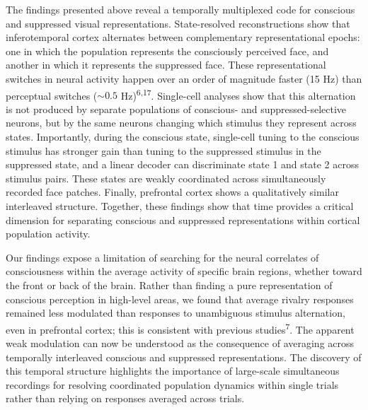 \documentclass{article}
\begin{document}
The findings presented above reveal a temporally multiplexed code for conscious and suppressed visual representations. State-resolved reconstructions show that inferotemporal cortex alternates between complementary representational epochs: one in which the population represents the consciously perceived face, and another in which it represents the suppressed face. These representational switches in neural activity happen over an order of magnitude faster (15 Hz) than perceptual switches (${\sim}0.5$ Hz)\textsuperscript{6,17}. Single-cell analyses show that this alternation is not produced by separate populations of conscious- and suppressed-selective neurons, but by the same neurons changing which stimulus they represent across states. Importantly, during the conscious state, single-cell tuning to the conscious stimulus has stronger gain than tuning to the suppressed stimulus in the suppressed state, and a linear decoder can discriminate state 1 and state 2 across stimulus pairs. These states are weakly coordinated across simultaneously recorded face patches. Finally, prefrontal cortex shows a qualitatively similar interleaved structure. Together, these findings show that time provides a critical dimension for separating conscious and suppressed representations within cortical population activity.

Our findings expose a limitation of searching for the neural correlates of consciousness within the average activity of specific brain regions, whether toward the front or back of the brain. Rather than finding a pure representation of conscious perception in high-level areas, we found that average rivalry responses remained less modulated than responses to unambiguous stimulus alternation, even in prefrontal cortex; this is consistent with previous studies\textsuperscript{7}. The apparent weak modulation can now be understood as the consequence of averaging across temporally interleaved conscious and suppressed representations. The discovery of this temporal structure highlights the importance of large-scale simultaneous recordings for resolving coordinated population dynamics within single trials rather than relying on responses averaged across trials.
\end{document}
